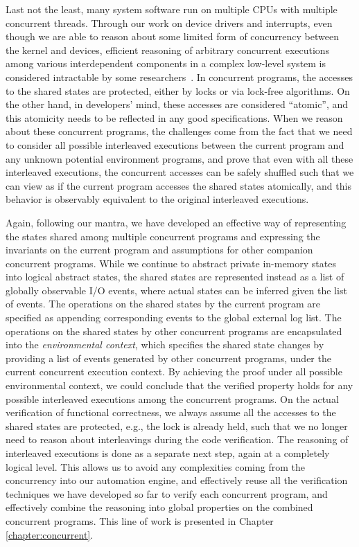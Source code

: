 Last not the least, many system software run on multiple CPUs with
multiple concurrent threads.   
Through our work on device drivers and interrupts, even though
we are able to reason about some limited form of concurrency between the kernel and
devices, efficient reasoning of arbitrary concurrent executions among various
interdependent components in a complex low-level system is considered
intractable by some researchers~\cite{vontessin13,peters15}. 
In concurrent programs, the accesses to the shared states are protected, either by
locks or via lock-free algorithms. On the other hand, in developers' mind, these accesses
are considered ``atomic'', and this atomicity needs to be reflected in any good specifications.
When we reason about these concurrent programs, the challenges come from the fact
that we need to consider all possible interleaved executions between the current program
and any unknown potential environment programs, and prove that even with all these interleaved
executions, the concurrent accesses can be safely shuffled such that we can view as if
the current program accesses the shared states atomically, and this behavior is observably
equivalent to the original interleaved executions.

Again, following our mantra, we have developed an effective way of representing the states
shared among multiple concurrent programs and expressing the invariants on the current program
and assumptions for other companion concurrent programs. While we continue to abstract private in-memory
states into logical abstract states, the shared states are represented instead as a list of globally
observable I/O events, where actual states can be inferred given the list of events. The operations
on the shared states by the current program are specified as appending corresponding events to the
global external log list. The operations on the shared states by other concurrent programs are encapsulated
into the {\it environmental context}, which specifies the shared state changes by providing a list of events
generated by other concurrent programs, under the current concurrent execution context.
By achieving the proof under all possible environmental context, we could conclude that
the verified property holds for any possible interleaved executions among the concurrent programs.
On the actual verification of functional correctness, we always assume all the accesses to the shared
states are protected, e.g., the lock is already held, such that we no longer need to reason about interleavings
during the code verification. The reasoning of interleaved executions is done as a separate next step,
again at a completely logical level.
This allows us to avoid any complexities coming from the concurrency into our automation engine,
and effectively reuse all the
verification techniques we have developed so far to verify each concurrent program, and effectively
combine the reasoning into global properties on the combined concurrent programs.
This line of work is presented in Chapter \ref{chapter:concurrent}.

